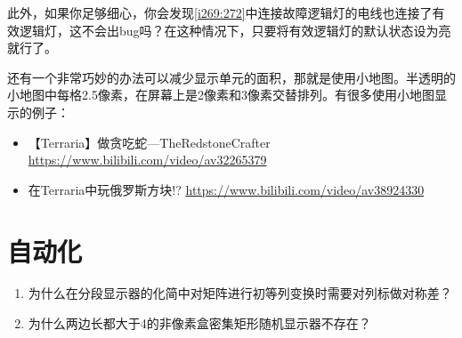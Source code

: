 此外，如果你足够细心，你会发现\autoref{i269:272}中连接故障逻辑灯的电线也连接了有效逻辑灯，这不会出bug吗？在这种情况下，只要将有效逻辑灯的默认状态设为亮就行了。

还有一个非常巧妙的办法可以减少显示单元的面积，那就是使用小地图。半透明的小地图中每格2.5像素，在屏幕上是2像素和3像素交替排列。有很多使用小地图显示的例子：
\begin{itemize}
\item 【Terraria】做贪吃蛇—TheRedstoneCrafter \url{https://www.bilibili.com/video/av32265379}
\item 在Terraria中玩俄罗斯方块!? \url{https://www.bilibili.com/video/av38924330}
\end{itemize}

\section{自动化}

\begin{enumerate}
\item 为什么在分段显示器的化简中对矩阵进行初等列变换时需要对列标做对称差？
\item 为什么两边长都大于4的非像素盒密集矩形随机显示器不存在？
\end{enumerate}